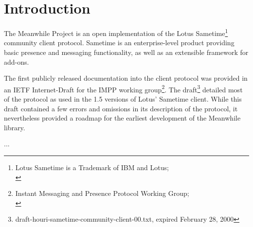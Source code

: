 

\chapter{Introduction}

\par{} The Meanwhile Project is an open implementation of the Lotus
Sametime\footnote[1]{Lotus Sametime is a Trademark of IBM and Lotus;\\
\sametimeLink} community client protocol. Sametime is an
enterprise-level product providing basic presence and messaging
functionality, as well as an extensible framework for add-ons.

\par{} The first publicly released documentation into the client
protocol was provided in an IETF Internet-Draft for the IMPP working
group\footnote[2]{Instant Messaging and Presence Protocol Working
Group;\\ \imppLink}. The
draft\footnote[3]{draft-houri-sametime-community-client-00.txt,
expired February 28, 2000} detailed most of the protocol as used in
the 1.5 versions of Lotus' Sametime client. While this draft contained
a few errors and omissions in its description of the protocol, it
nevertheless provided a roadmap for the earliest development of the
Meanwhile library.

\par{} ...

